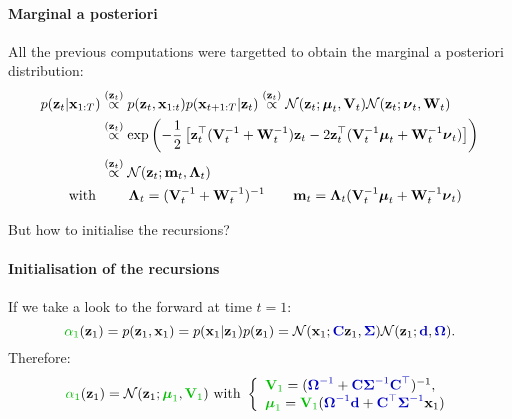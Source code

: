 \paragraph{Marginal a posteriori}
All the previous computations were targetted to obtain the marginal a posteriori distribution:
\begin{align}
p(\boldsymbol{\mathbf{z}}_t|\boldsymbol{\mathbf{x}}_{1:T}) &\stackrel{(\boldsymbol{\mathbf{z}}_t)}{\propto} p(\boldsymbol{\mathbf{z}}_t,\boldsymbol{\mathbf{x}}_{1:t})p(\boldsymbol{\mathbf{x}}_{t+1:T}|\boldsymbol{\mathbf{z}}_t)  
\stackrel{(\boldsymbol{\mathbf{z}}_t)}{\propto} {\cal N}(\boldsymbol{\mathbf{z}}_t;\boldsymbol{\mu}_t,\boldsymbol{\mathbf{V}}_t){\cal N}(\boldsymbol{\mathbf{z}}_t;\boldsymbol{\nu}_t,\boldsymbol{\mathbf{W}}_t)\\
&\stackrel{(\boldsymbol{\mathbf{z}}_t)}{\propto} \textrm{exp}\left(-\frac{1}{2}\left[ \boldsymbol{\mathbf{z}}_t^\top(\boldsymbol{\mathbf{V}}_t^{-1}+\boldsymbol{\mathbf{W}}_t^{-1})\boldsymbol{\mathbf{z}}_t - 2 \boldsymbol{\mathbf{z}}_t^\top(\boldsymbol{\mathbf{V}}_t^{-1}\boldsymbol{\mu}_t + \boldsymbol{\mathbf{W}}_t^{-1}\boldsymbol{\nu}_t) \right]\right)\\
&\stackrel{(\boldsymbol{\mathbf{z}}_t)}{\propto} {\cal N}(\boldsymbol{\mathbf{z}}_t;\boldsymbol{\mathbf{m}}_t,\boldsymbol{\mathbf{\Lambda}}_{t})\\
\text{with } & \qquad\boldsymbol{\mathbf{\Lambda}}_{t} = (\boldsymbol{\mathbf{V}}_t^{-1}+\boldsymbol{\mathbf{W}}_t^{-1})^{-1} \qquad \boldsymbol{\mathbf{m}}_t = \boldsymbol{\mathbf{\Lambda}}_{t}(\boldsymbol{\mathbf{V}}_t^{-1}\boldsymbol{\mu}_t + \boldsymbol{\mathbf{W}}_t^{-1}\boldsymbol{\nu}_t) \label{eq:marginal-post-param}
\end{align}

But how to initialise the recursions?

\paragraph{Initialisation of the recursions} If we take a look to the forward at time $t=1$:
\begin{equation}
 \paint{mygreen}{\alpha_1}(\bs{z}_1) = p(\bs{z}_1,\bs{x}_1) = p(\bs{x}_1|\bs{z}_1)p(\bs{z}_1) = \MN(\bs{x}_1;\paint{myblue}{\bs{C}}\bs{z}_1,\paint{myblue}{\bs{\Sigma}})\MN(\bs{z}_1;\paint{myblue}{\bs{d}},\paint{myblue}{\bs{\Omega}}).
\end{equation}
Therefore:
\begin{equation}
 \paint{mygreen}{\alpha_1}(\bs{z}_1) = {\cal N}(\bs{z}_1;\paint{mygreen}{\boldsymbol{\mu}_1},\paint{mygreen}{\bs{V}_1}) \text{ with } \left\{\begin{array}{l} \paint{mygreen}{\bs{V}_1} = (\paint{myblue}{\bs{\Omega}^{-1}} + \paint{myblue}{\bs{C}}\paint{myblue}{\bs{\Sigma}^{-1}}\paint{myblue}{\bs{C}^\top})^{-1}, \\ \paint{mygreen}{\boldsymbol{\mu}_1} = \paint{mygreen}{\bs{V}_1}(\paint{myblue}{\bs{\Omega}^{-1}}\paint{myblue}{\bs{d}} + \paint{myblue}{\bs{C}^\top}\paint{myblue}{\bs{\Sigma}^{-1}}\bs{x}_1)\end{array}\right.
\end{equation}


